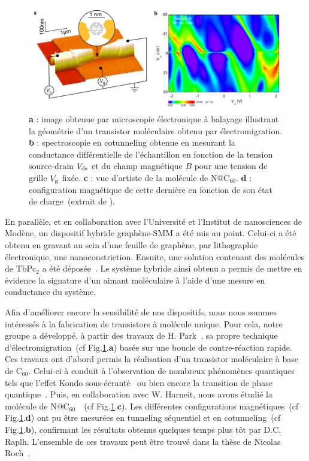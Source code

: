 \begin{figure}
\centering \includegraphics[scale=0.45]{Spintronique/RochC60/RochC60.pdf}
\caption{\textbf{a} : image obtenue par microscopie électronique à balayage illustrant la géométrie d'un transistor moléculaire obtenu par électromigration. \textbf{b} : spectroscopie en cotunneling obtenue en mesurant la conductance différentielle de l'échantillon en fonction de la tension source-drain $V_{\rm{ds}}$ et du champ magnétique $B$ pour une tension de grille $V_{\rm{g}}$ fixée. \textbf{c} : vue d'artiste de la molécule de N@C$_{60}$. \textbf{d} : configuration magnétique de cette dernière en fonction de son état de charge~(extrait de \cite{Roch2011}).}
\label{RochC60}
\end{figure}

En parallèle, et en collaboration avec l'Université et l'Institut de nanosciences de Modène, un dispositif hybride graphène-SMM a été mis au point. Celui-ci a été obtenu en gravant au sein d'une feuille de graphène, par lithographie électronique, une nanoconstriction. Ensuite, une solution contenant des molécules de TbPc$_{2}$ a été déposée~\cite{Candini2011}. Le système hybride ainsi obtenu a permis de mettre en évidence la signature d'un aimant moléculaire à l'aide d'une mesure en conductance du système.

Afin d'améliorer encore la sensibilité de nos dispositifs, nous nous sommes intéressés à la fabrication de transistors à molécule unique. Pour cela, notre groupe a développé, à partir des travaux de H. Park~\cite{Park1999}, sa propre technique d'électromigration~(cf Fig.\ref{RochC60}.\textbf{a}) basée sur une boucle de contre-réaction rapide. Ces travaux ont d'abord permis la réalisation d'un transistor moléculaire à base de C$_{60}$. Celui-ci à conduit à l'observation de nombreux phénomènes quantiques tels que l'effet Kondo sous-écranté~\cite{Roch2009} ou bien encore la transition de phase quantique~\cite{Roch2008}. Puis, en collaboration avec W. Harneit, nous avons étudié la molécule de N@C$_{60}$~\cite{Roch2011}~(cf Fig.\ref{RochC60}.\textbf{c}). Les différentes configurations magnétiques~(cf Fig.\ref{RochC60}.\textbf{d}) ont pu \^etre mesurées en tunneling séquentiel et en cotunneling~(cf Fig.\ref{RochC60}.\textbf{b}), confirmant les résultats obtenus quelques temps plus tôt par D.C. Raplh. L'ensemble de ces travaux peut être trouvé dans la thèse de Nicolas Roch~\cite{RochPhd}.

